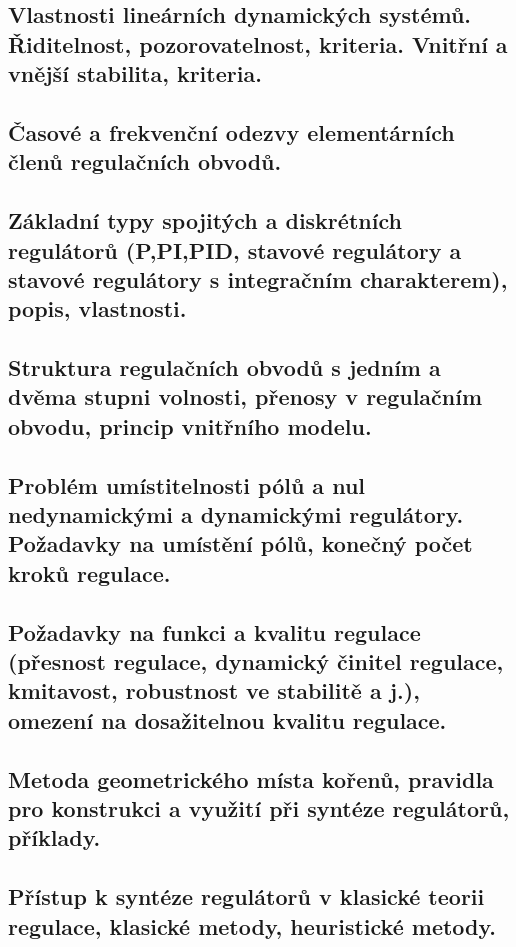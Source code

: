 \subsection{Vlastnosti lineárních dynamických systémů. Řiditelnost, pozorovatelnost, kriteria. Vnitřní a vnější stabilita, kriteria.}

\subsection{Časové a frekvenční odezvy elementárních členů regulačních obvodů.}

\subsection{Základní typy spojitých a diskrétních regulátorů (P,PI,PID, stavové regulátory a stavové regulátory s integračním charakterem), popis, vlastnosti.}

\subsection{Struktura regulačních obvodů s jedním a dvěma stupni volnosti, přenosy v regulačním obvodu, princip vnitřního modelu.}

\subsection{Problém umístitelnosti pólů a nul nedynamickými a dynamickými regulátory. Požadavky na umístění pólů, konečný počet kroků regulace.}

\subsection{Požadavky na funkci a kvalitu regulace (přesnost regulace, dynamický činitel regulace, kmitavost, robustnost ve stabilitě a j.), omezení na dosažitelnou kvalitu regulace.}

\subsection{Metoda geometrického místa kořenů, pravidla pro konstrukci a využití při syntéze regulátorů, příklady.}

\subsection{Přístup k syntéze regulátorů v klasické teorii regulace, klasické metody, heuristické metody.}

